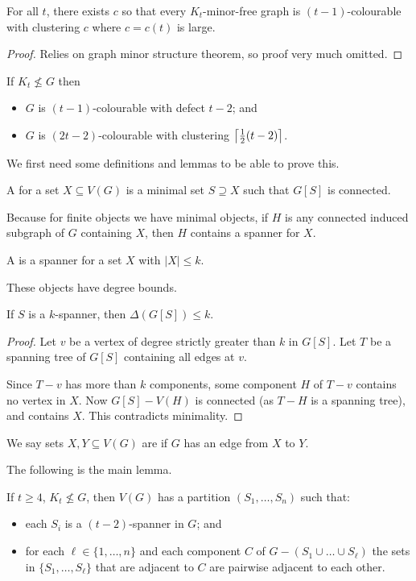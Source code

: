 \documentclass[main.tex]{subfiles}
\begin{document}
\begin{theorem}
  For all $t$, there exists $c$ so that every $K_t$-minor-free graph is
  $(t-1)$-colourable with clustering $c$ where $c = c(t)$ is large.
\end{theorem}
\begin{proof}
  Relies on graph minor structure theorem, so proof very much omitted.
\end{proof}
\begin{theorem}
  If $K_t\not\leq G$ then
  \begin{itemize}
    \item $G$ is $(t-1)$-colourable with defect $t-2$; and
    \item $G$ is $(2t-2)$-colourable with clustering $\left\lceil \frac{1}{2}(t-2) \right\rceil$.
  \end{itemize}
\end{theorem}
We first need some definitions and lemmas to be able to prove this.
\begin{definition*}[Spanner]
  A  for a set $X\subseteq V(G)$ is a minimal set $S\supseteq X$
  such that $G[S]$ is connected.
\end{definition*}
Because for finite objects we have minimal objects, if $H$ is any connected
induced subgraph of $G$ containing $X$, then $H$ contains a spanner for $X$.
\begin{definition*}[$k$-spanner]
  A  is a spanner for a set $X$ with
  $|X|\leq k$.
\end{definition*}
These objects have degree bounds.
\begin{proposition}
  If $S$ is a $k$-spanner, then $\Delta(G[S])\leq k$.
\end{proposition}
\begin{proof}
  Let $v$ be a vertex of degree strictly greater than $k$ in $G[S]$.
  Let $T$ be a spanning tree of $G[S]$ containing all edges at $v$.

  Since $T - v$ has more than $k$ components, some component $H$ of $T - v$
  contains no vertex in $X$.
  Now $G[S] - V(H)$ is connected (as $T - H$ is a spanning tree), and contains
  $X$.
  This contradicts minimality.
\end{proof}
\begin{definition*}
  We say sets $X,Y\subseteq V(G)$ are  if $G$ has an edge from
  $X$ to $Y$.
\end{definition*}
The following is the main lemma.
\begin{lemma}
  If $t\geq 4$, $K_t\not\leq G$, then $V(G)$ has a partition $(S_1,\ldots,S_n)$
  such that:
  \begin{itemize}
    \item each $S_i$ is a $(t-2)$-spanner in $G$; and
    \item for each $\ell\in\{1,\ldots,n\}$ and each component $C$ of
      $G - (S_1\cup\ldots\cup S_\ell)$ the sets in $\{S_1,\ldots, S_\ell\}$
      that are adjacent to $C$ are pairwise adjacent to each other.
  \end{itemize}
\end{lemma}
\end{document}
